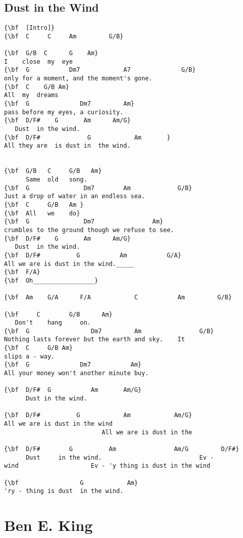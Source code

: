 \documentclass[a4paper]{article}
\begin{document}
\subsection{Dust in the Wind}
\begin{Verbatim}[commandchars=\\\{\}]
{\bf  [Intro]}
{\bf  C     C     Am         G/B}

{\bf  G/B  C      G    Am}
I    close  my  eye
{\bf  G           Dm7            A7              G/B}
only for a moment, and the moment's gone.
{\bf  C    G/B Am}
All  my  dreams
{\bf  G              Dm7         Am}
pass before my eyes, a curiosity.
{\bf  D/F#    G       Am      Am/G}
   Dust  in the wind.
{\bf  D/F#             G            Am       }
All they are  is dust in  the wind.


{\bf  G/B   C     G/B   Am}
      Same  old   song.
{\bf  G               Dm7        Am             G/B}
Just a drop of water in an endless sea.   
{\bf  C     G/B   Am }
{\bf  All   we    do}
{\bf  G               Dm7                Am}
crumbles to the ground though we refuse to see.
{\bf  D/F#    G       Am      Am/G}
   Dust  in the wind.                
{\bf  D/F#          G           Am           G/A}
All we are is dust in the wind._____      
{\bf  F/A}
{\bf  Oh_________________}

{\bf  Am    G/A      F/A            C           Am         G/B}

{\bf     C        G/B      Am}
   Don't    hang     on.
{\bf  G                 Dm7         Am                G/B}
Nothing lasts forever but the earth and sky.    It
{\bf  C     G/B Am}
slips a - way.
{\bf  G              Dm7           Am}
All your money won't another minute buy.

{\bf  D/F#  G           Am       Am/G}
      Dust in the wind.        

{\bf  D/F#          G            Am            Am/G}
All we are is dust in the wind
                           All we are is dust in the 

{\bf  D/F#        G          Am                Am/G         D/F#}
      Dust     in the wind.                           Ev -
wind                    Ev - 'y thing is dust in the wind 

{\bf                 G            Am}
'ry - thing is dust  in the wind.

\end{Verbatim}
\newpage
\section{Ben E. King}
\end{document}
